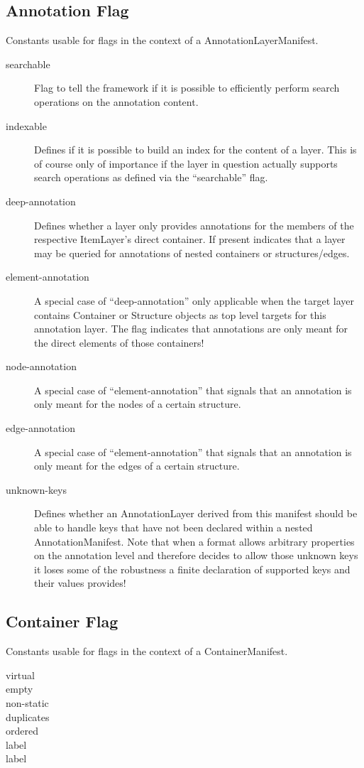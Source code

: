 \documentclass[11pt,a4paper]{report}
\begin{document}
\subsection{Annotation Flag}
Constants usable for flags in the context of a AnnotationLayerManifest.
\label{sec:enum-annotation-flag}
\begin{description}
	\item[searchable] Flag to tell the framework if it is possible to efficiently perform search operations on the annotation content.
	\item[indexable] Defines if it is possible to build an index for the content of a layer. This is of course only of importance if the layer in question actually supports search operations as defined via the ``searchable'' flag.
	\item[deep-annotation] Defines whether a layer only provides annotations for the members of the respective ItemLayer's direct container. If present indicates that a layer may be queried for annotations of nested containers or structures/edges.
	\item[element-annotation] A special case of ``deep-annotation'' only applicable when the target layer contains Container or Structure objects as top level targets for this annotation layer. The flag indicates that annotations are only meant for the direct elements of those containers!
	\item[node-annotation] A special case of ``element-annotation'' that signals that an annotation is only meant for the nodes of a certain structure.
	\item[edge-annotation] A special case of ``element-annotation'' that signals that an annotation is only meant for the edges of a certain structure.
	\item[unknown-keys] Defines whether an AnnotationLayer derived from this manifest should be able to handle keys that have not been declared within a nested AnnotationManifest. Note that when a format allows arbitrary properties on the annotation level and therefore decides to allow those unknown keys it loses some of the robustness a finite declaration of supported keys and their values provides!
\end{description}

\subsection{Container Flag}
Constants usable for flags in the context of a ContainerManifest.
\label{sec:enum-container-flag}
\begin{description}
	\item[virtual] 
	\item[empty] 
	\item[non-static] 
	\item[duplicates] 
	\item[ordered] 
	\item[label] 
	\item[label] 
\end{description}
\end{document}
